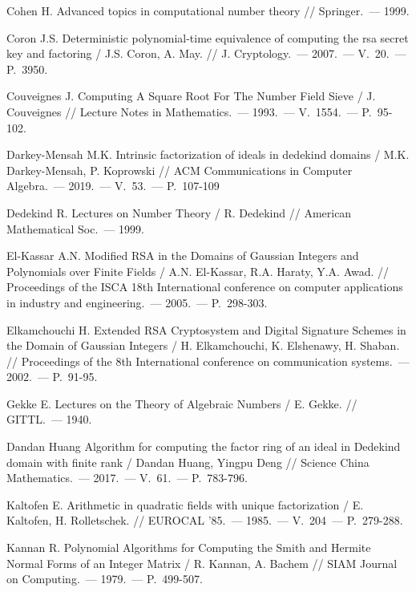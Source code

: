 \begin{thebibliography}{99}
    Cohen H. Advanced topics in computational number theory // Springer.~--- 1999.
    
    Coron J.S. Deterministic polynomial-time equivalence of computing the rsa secret key and factoring / J.S. Coron, A. May. // J. Cryptology.~--- 2007.~--- V.~20.~--- P.~3950.

    Couveignes J. Computing A Square Root For The Number Field Sieve / J. Couveignes // Lecture Notes in Mathematics.~--- 1993.~--- V.~1554.~--- P.~95-102.

    Darkey-Mensah M.K. Intrinsic factorization of ideals in dedekind domains / M.K. Darkey-Mensah, P. Koprowski // ACM Communications in Computer Algebra.~--- 2019.~--- V.~53.~--- P.~107-109

    Dedekind R. Lectures on Number Theory / R. Dedekind // American Mathematical Soc.~--- 1999.

    El-Kassar A.N. Modified RSA in the Domains of Gaussian Integers and Polynomials over Finite Fields / A.N. El-Kassar, R.A. Haraty, Y.A. Awad. // Proceedings of the ISCA 18th International conference on computer applications in industry and engineering.~--- 2005.~--- P.~298-303.

    Elkamchouchi H. Extended RSA Cryptosystem and Digital Signature Schemes in the Domain of Gaussian Integers / H. Elkamchouchi, K. Elshenawy, H. Shaban. // Proceedings of the 8th International conference on communication systems.~--- 2002.~--- P.~91-95.

    Gekke E. Lectures on the Theory of Algebraic Numbers / E. Gekke. // GITTL.~--- 1940.

    Dandan Huang Algorithm for computing the factor ring of an ideal in Dedekind domain with finite rank / Dandan Huang, Yingpu Deng // Science China Mathematics.~--- 2017.~--- V.~61.~--- P.~783-796.

    Kaltofen E. Arithmetic in quadratic fields with unique factorization / E. Kaltofen, H. Rolletschek. // EUROCAL '85.~--- 1985.~--- V.~204~--- P.~279-288.

    Kannan R. Polynomial Algorithms for Computing the Smith and Hermite Normal Forms of an Integer Matrix / R. Kannan, A. Bachem // SIAM Journal on Computing.~--- 1979.~--- P.~499-507.


\end{thebibliography}
